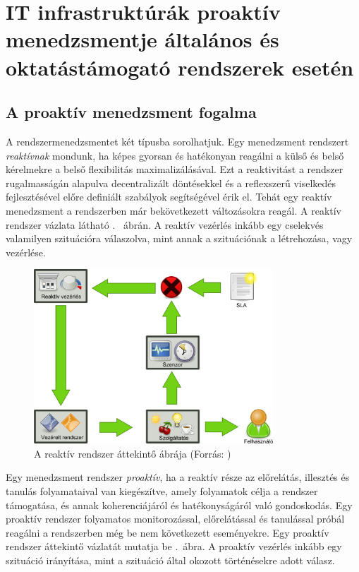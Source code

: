 \chapter{IT infrastruktúrák proaktív menedzsmentje általános és oktatástámogató rendszerek esetén}

\section{A proaktív menedzsment fogalma}

A rendszermenedzsmentet két típusba sorolhatjuk.  Egy menedzsment rendszert \textit{reaktívnak} mondunk, ha képes gyorsan és hatékonyan reagálni a külső és belső kérelmekre a belső flexibilitás maximalizálásával. Ezt a reaktivitást a rendszer rugalmasságán alapulva decentralizált döntésekkel és a reflexszerű viselkedés fejlesztésével előre definiált szabályok segítségével érik el\cite{aftsarapms}. Tehát egy reaktív menedzsment a rendszerben már bekövetkezett változásokra reagál. A reaktív rendszer vázlata látható .~ ábrán. A reaktív vezérlés inkább egy cselekvés valamilyen szituációra válaszolva, mint annak a szituációnak a létrehozása, vagy vezérlése\cite{patariczapro}.

\begin{figure}[h!]
\centering
\includegraphics[width=0.80\textwidth]{figures/reactive_system.png}
\caption{A reaktív rendszer áttekintő ábrája (Forrás: \cite{patariczapro}) \label{fig:reactive_system}}
\end{figure}

Egy menedzsment rendszer \textit{proaktív}, ha a reaktív része az előrelátás, illesztés és tanulás folyamataival van kiegészítve, amely folyamatok célja a rendszer támogatása, és annak koherenciájáról és hatékonyságáról való gondoskodás. Egy proaktív rendszer folyamatos monitorozással, előrelátással és tanulással próbál reagálni a rendszerben még be nem következett eseményekre. Egy proaktív rendszer áttekintő vázlatát mutatja be .~ábra. A proaktív vezérlés inkább egy szituáció irányítása, mint a szituáció által okozott történésekre adott válasz\cite{patariczapro}.

